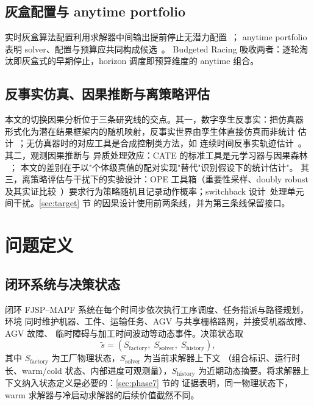 \documentclass[11pt,a4paper]{article}
\newcommand{\racing}{Budgeted Racing}
\begin{document}
\subsection{灰盒配置与 anytime portfolio}

实时灰盒算法配置利用求解器中间输出提前停止无潜力配置~\citep{weiss2025graybox}；
anytime portfolio 表明 solver、配置与预算应共同构成候选~\citep{schede2026anytime}。
\racing{} 吸收两者：逐轮淘汰即灰盒式的早期停止，horizon 调度即预算维度的
anytime 组合。

\subsection{反事实仿真、因果推断与离策略评估}

本文的切换因果分析位于三条研究线的交点。其一，数字孪生反事实：把仿真器
形式化为潜在结果框架内的随机映射，反事实世界由孪生体直接仿真而非统计
估计~\citep{laudy2026dtcf}；无仿真器时的对应工具是合成控制类方法，如
连续时间反事实轨迹估计~\citep{bellot2021policy}。其二，观测因果推断与
异质处理效应：CATE 的标准工具是元学习器与因果森林
~\citep{kunzel2019metalearners,wager2018estimation,chernozhukov2024causalml}；
本文的差别在于以"个体级真值的配对实现"替代"识别假设下的统计估计"。
其三，离策略评估与干扰下的实验设计：OPE 工具箱（重要性采样、doubly
robust 及其实证比较~\citep{dudik2014doubly,uehara2022review,
voloshin2021empirical}）要求行为策略随机且记录动作概率；switchback
设计~\citep{bojinov2023switchback}处理单元间干扰。\ref{sec:target} 节
的因果设计使用前两条线，并为第三条线保留接口。

\section{问题定义}
\label{sec:problem}

\subsection{闭环系统与决策状态}

闭环 FJSP--MAPF 系统在每个时间步依次执行工序调度、任务指派与路径规划，环境
同时维护机器、工件、运输任务、AGV 与共享栅格路网，并接受机器故障、AGV 故障、
临时障碍与加工时间波动等动态事件。决策状态取
\begin{equation}
\tilde{s} = (S_\text{factory},\; S_\text{solver},\; S_\text{history}),
\end{equation}
其中 $S_\text{factory}$ 为工厂物理状态，$S_\text{solver}$ 为当前求解器上下文
（组合标识、运行时长、warm/cold 状态、内部进度可观测量），$S_\text{history}$
为近期动态摘要。将求解器上下文纳入状态定义是必要的：\ref{sec:phase7} 节的
证据表明，同一物理状态下，warm 求解器与冷启动求解器的后续价值截然不同。
\end{document}
